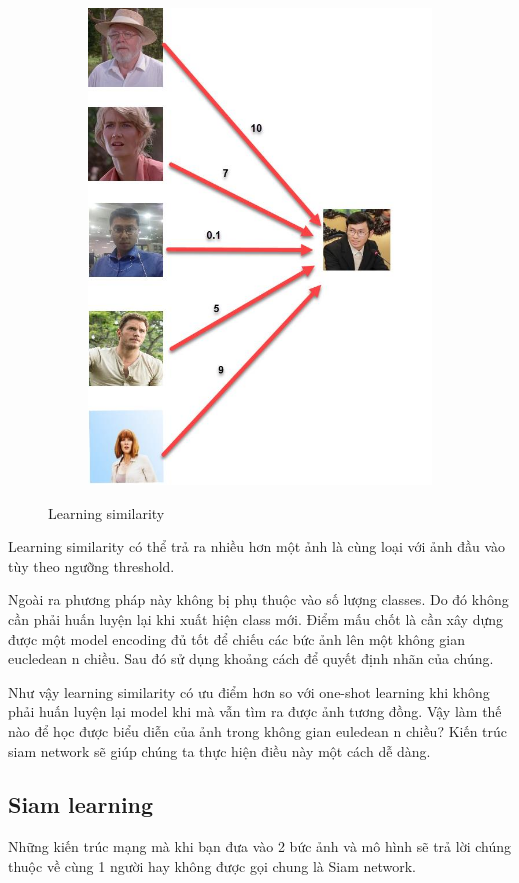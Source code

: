 \begin{figure}
    \begin{subfigure}{1.\textwidth}
        \begin{center}
            \includegraphics[width=0.5\linewidth]{Chapters/items/chap2_15.jpg}
        \end{center}
        \label{fig:chap2_15}
    \end{subfigure}
    \caption{Learning similarity}
\end{figure}

Learning similarity có thể trả ra nhiều hơn một ảnh là cùng loại với ảnh đầu vào tùy theo ngưỡng threshold.

Ngoài ra phương pháp này không bị phụ thuộc vào số lượng classes.
Do đó không cần phải huấn luyện lại khi xuất hiện class mới.
Điểm mấu chốt là cần xây dựng được một model encoding đủ tốt để chiếu các bức
ảnh lên một không gian eucledean n chiều. Sau đó sử dụng khoảng cách để quyết
định nhãn của chúng.

Như vậy learning similarity có ưu điểm hơn so với one-shot learning khi không phải
huấn luyện lại model khi mà vẫn tìm ra được ảnh tương đồng.
Vậy làm thế nào để học được biểu diễn của ảnh trong không gian euledean n chiều?
Kiến trúc siam network sẽ giúp chúng ta thực hiện điều này một cách dễ dàng.

\subsection{Siam learning}

Những kiến trúc mạng mà khi bạn đưa vào 2 bức ảnh và mô hình sẽ trả lời chúng thuộc về
cùng 1 người hay không được gọi chung là Siam network.

